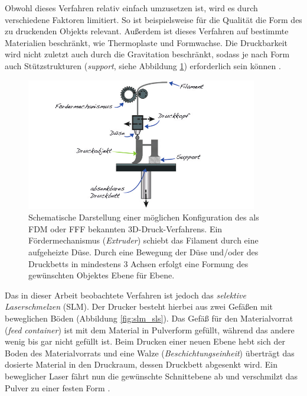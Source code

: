 		Obwohl dieses Verfahren relativ einfach umzusetzen ist, wird es durch verschiedene
		Faktoren limitiert. So ist beispielsweise für die Qualität die Form des zu druckenden
		Objekts relevant. Außerdem ist dieses Verfahren auf bestimmte Materialien beschränkt, wie
		Thermoplaste und Formwachse. Die Druckbarkeit wird nicht zuletzt auch durch die
		Gravitation beschränkt, sodass je nach Form auch Stützstrukturen (\emph{support}, siehe
		Abbildung \ref{fig:fdm}) erforderlich sein können \cite{wikipedia2021fused}.

		\begin{figure}[!ht]
			\centering
			\includegraphics[width=0.9\textwidth]{chapter/main/img/fdm.png}
			\caption[Schematische Darstellung des FDM-/FFF-Verfahrens]{Schematische Darstellung
			einer möglichen Konfiguration des als FDM oder FFF bekannten 3D-Druck-Verfahrens. Ein
			Fördermechanismus (\emph{Extruder}) schiebt das Filament durch eine aufgeheizte Düse.
			Durch eine Bewegung der Düse und/oder des Druckbetts in mindestens 3 Achsen erfolgt
			eine Formung des gewünschten Objektes Ebene für Ebene. \cite[S. 114]{horsch20143d}}
			\label{fig:fdm}
		\end{figure}

		Das in dieser Arbeit beobachtete Verfahren ist jedoch das \emph{selektive Laserschmelzen}
		(SLM). Der Drucker besteht hierbei aus zwei Gefäßen mit beweglichen Böden (Abbildung
		\ref{fig:slm_sls}). Das Gefäß für den Materialvorrat (\emph{feed container}) ist mit dem
		Material in Pulverform gefüllt, während das andere wenig bis gar nicht gefüllt ist. Beim
		Drucken einer neuen Ebene hebt sich der Boden des Materialvorrats und eine Walze
		(\emph{Beschichtungseinheit}) überträgt das dosierte Material in den Druckraum, dessen
		Druckbett abgesenkt wird. Ein beweglicher Laser fährt nun die gewünschte Schnittebene ab
		und verschmilzt das Pulver zu einer festen Form \cite{horsch20143d}.

